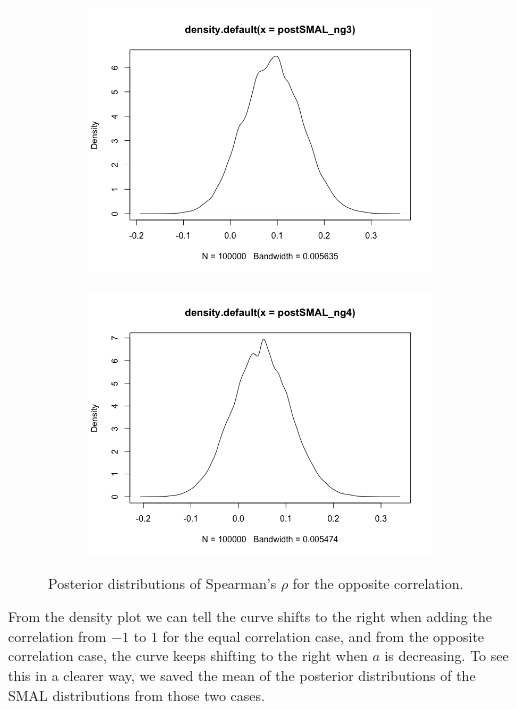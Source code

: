\documentclass[mstat,12pt]{unswthesis}  %
\numberwithin{equation}{section}
\begin{document}
\begin{figure}[h]
\begin{subfigure}{.32\textwidth}
  \centering
  \includegraphics[width=\linewidth]{postSMALng3.png}  
  \label{fig:sub-third}
\end{subfigure}
\begin{subfigure}{.32\textwidth}
  \centering
  \includegraphics[width=\linewidth]{postSMALng4.png}  
  \label{fig:sub-fourth}
\end{subfigure}
\caption{Posterior distributions of Spearman's $\rho$ for the opposite correlation.}
\label{fig:fig}
\end{figure}
From the density plot we can tell the curve shifts to the right when adding the correlation from $-1$ to $1$ for the equal correlation case, and from the opposite correlation case, the curve keeps shifting to the right when $a$ is decreasing. To see this in a clearer way, we saved the mean of the posterior distributions of the SMAL distributions from those two cases.
\end{document}
